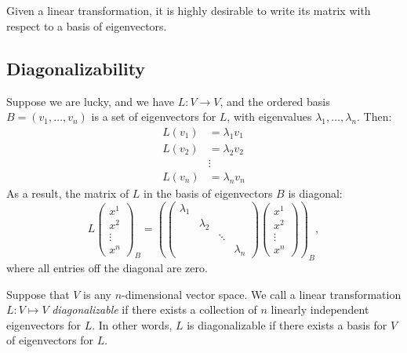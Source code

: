 \chapter{\diagTitle}\label{sec:diagonalization}



Given a linear transformation, it is highly desirable to write its matrix  with respect to a basis of eigenvectors.

\section{Diagonalizability}

Suppose we are lucky, and we have $L \colon V\to V$, and the ordered basis 
$B=(v_1, \ldots, v_n )$ is a set of %
eigenvectors for $L$, with eigenvalues $\lambda_1, \ldots, \lambda_n$.  Then:
\begin{align*}
L(v_1)&=\lambda_1 v_1 \\
L(v_2)&=\lambda_2 v_2 \\
&\vdots  \\
L(v_n)&=\lambda_n v_n
\end{align*}
As a result, the matrix of $L$ in the basis of eigenvectors $B$ is diagonal:
\[
L\begin{pmatrix}
x^1\\
x^2\\
\vdots\\
x^n
\end{pmatrix}_B
=
\left(
\begin{pmatrix}
\lambda_1    \\
& \lambda_2 &  & \\
&  & \ddots &  \\
& & & \lambda_n
\end{pmatrix}
\begin{pmatrix}
x^1\\
x^2\\
\vdots\\
x^n
\end{pmatrix}
\right)_B
,
\]
where all entries off the diagonal are zero.

Suppose that \(V\) is any \(n\)-dimensional vector space. We call a linear transformation $L \colon V\mapsto V$ \emph{diagonalizable} if there exists a collection of $n$ linearly independent eigenvectors for $L$.  In other words, $L$ is diagonalizable if there exists a basis for $V$ of eigenvectors for $L$.  

